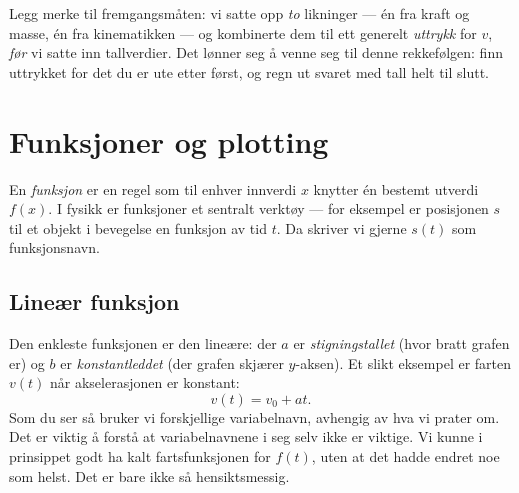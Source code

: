 
\begin{mymerk*}{}
Legg merke til fremgangsmåten: vi satte opp \emph{to} likninger — én fra kraft og masse, én fra kinematikken — og kombinerte dem til ett generelt \emph{uttrykk} for $v$, \emph{før} vi satte inn tallverdier. Det lønner seg å venne seg til denne rekkefølgen: finn uttrykket for det du er ute etter først, og regn ut svaret med tall helt til slutt.
\end{mymerk*}


\section{Funksjoner og plotting}

En \emph{funksjon} er en regel som til enhver innverdi $x$ knytter én bestemt utverdi $f(x)$. I fysikk er funksjoner et sentralt verktøy — for eksempel er posisjonen $s$ til et objekt i bevegelse en funksjon av tid $t$. Da skriver vi gjerne $s(t)$ som funksjonsnavn. 

\subsection*{Lineær funksjon}
Den enkleste funksjonen er den lineære:
der $a$ er \emph{stigningstallet} (hvor bratt grafen er) og $b$ er \emph{konstantleddet} (der grafen skjærer $y$-aksen). Et slikt eksempel er farten $v(t)$ når akselerasjonen er konstant: \[v(t) = v_0 + at.\]
Som du ser så bruker vi forskjellige variabelnavn, avhengig av hva vi prater om. Det er viktig å forstå at variabelnavnene i seg selv ikke er viktige. Vi kunne i prinsippet godt ha kalt fartsfunksjonen for $f(t)$, uten at det hadde endret noe som helst. Det er bare ikke så hensiktsmessig. 

